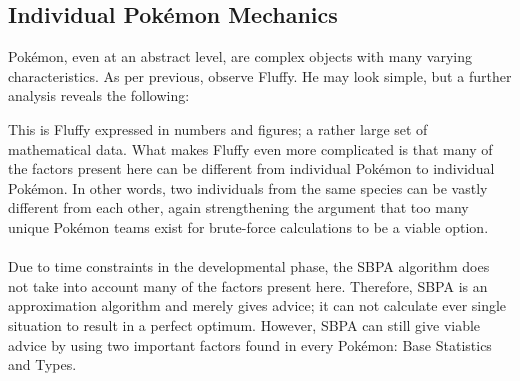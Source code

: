 \documentclass{article}
\begin{document}
\subsection{Individual Pok\'emon Mechanics}
Pok\'emon, even at an abstract level, are complex objects with many varying characteristics. As per previous, observe Fluffy. He may look simple, but a further analysis reveals the following:
\begin{center}
\end{center}
This is Fluffy expressed in numbers and figures; a rather large set of mathematical data. What makes Fluffy even more complicated is that many of the factors present here can be different from individual Pok\'emon to individual Pok\'emon. In other words, two individuals from the same species can be vastly different from each other, again strengthening the argument that too many unique Pok\'emon teams exist for brute-force calculations to be a viable option.\\\\
Due to time constraints in the developmental phase, the SBPA algorithm does not take into account many of the factors present here. Therefore, SBPA is an approximation algorithm and merely gives advice; it can not calculate ever single situation to result in a perfect optimum. However, SBPA can still give viable advice by using two important factors found in every Pok\'emon: Base Statistics and Types.
\end{document}

